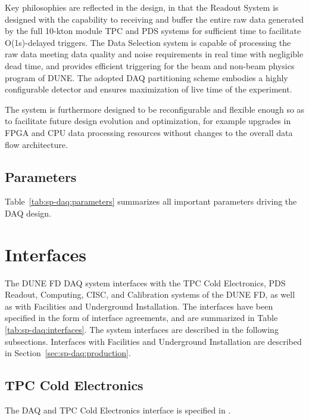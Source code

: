 Key philosophies are reflected in the design, in that the Readout System is
designed with the capability to receiving and buffer the entire raw data generated by
the full 10-kton module TPC and PDS systems for sufficient time to
facilitate O(1s)-delayed triggers. The Data Selection system
is capable of processing the raw data meeting data quality and noise
requirements in real time with negligible dead time, and provides
efficient triggering for the beam and non-beam physics program of
DUNE. The adopted DAQ partitioning scheme embodies a highly configurable detector and ensures
maximization of live time of the experiment. 

The system is furthermore designed to be reconfigurable and flexible
enough so as to facilitate future design evolution and optimization,
for example upgrades in FPGA and CPU data processing resources without changes to the
overall data flow architecture.

\subsection{Parameters}
\label{sec:sp-daq:parameters}

Table~\ref{tab:sp-daq:parameters} summarizes all important parameters
driving the DAQ design.



\section{Interfaces}
\label{sec:sp-daq:interfaces}
The DUNE FD DAQ system interfaces with the TPC Cold Electronics, PDS
Readout, Computing, CISC, and Calibration systems of the DUNE
FD, as well as with Facilities and Underground Installation. The
interfaces have been specified in the form of interface agreements,
and are summarized in Table \ref{tab:sp-daq:interfaces}. The system
interfaces are described in the following subsections. Interfaces with
Facilities and Underground Installation are described in Section~\ref{sec:sp-daq:production}.


\subsection{TPC Cold Electronics}
The DAQ and TPC Cold Electronics interface is specified in \cite{docid-6742}.
